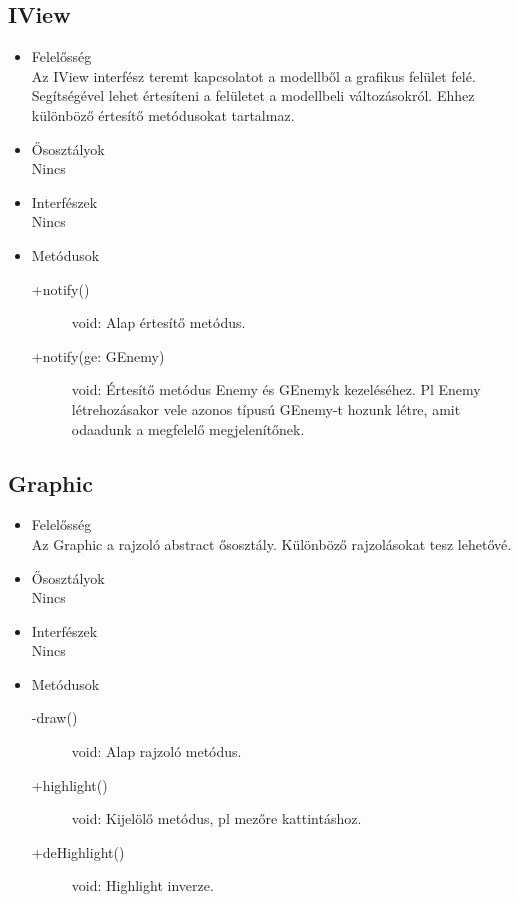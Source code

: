 \subsection{IView}
\begin{itemize}
\item Felelősség\\
Az IView interfész teremt kapcsolatot a modellből a grafikus felület felé. Segítségével lehet értesíteni a felületet a modellbeli változásokról. Ehhez különböző értesítő metódusokat tartalmaz.
\item Ősosztályok\\
Nincs
\item Interfészek\\
Nincs
\item Metódusok\\
	\begin{description}
		\item[+notify()] void: Alap értesítő metódus.
		\item[+notify(ge: GEnemy)] void: Értesítő metódus Enemy és GEnemyk kezeléséhez. Pl Enemy létrehozásakor vele azonos típusú GEnemy-t hozunk létre, amit odaadunk a megfelelő megjelenítőnek.
	\end{description}
\end{itemize}

\subsection{Graphic}
\begin{itemize}
\item Felelősség\\
Az Graphic a rajzoló abstract ősosztály. Különböző rajzolásokat tesz lehetővé.
\item Ősosztályok\\
Nincs
\item Interfészek\\
Nincs
\item Metódusok\\
	\begin{description}
		\item[-draw()] void: Alap rajzoló metódus.
		\item[+highlight()] void: Kijelölő metódus, pl mezőre kattintáshoz.
		\item[+deHighlight()] void: Highlight inverze.
	\end{description}
\end{itemize}

